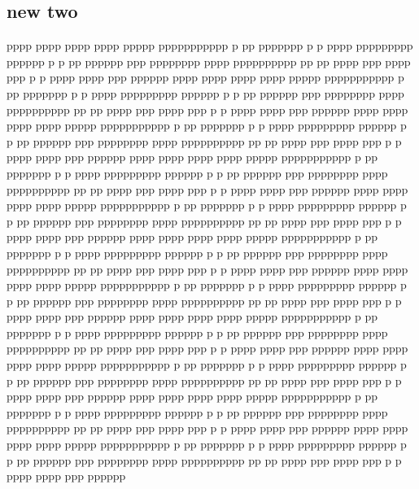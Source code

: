 \documentclass[11pt]{article}
\begin{document}
\subsection{ new two }
pppp pppp pppp pppp ppppp ppppppppppp p pp ppppppp p p pppp ppppppppp pppppp p p pp pppppp ppp pppppppp pppp pppppppppp pp pp pppp ppp pppp ppp p  p pppp pppp ppp pppppp pppp pppp pppp pppp ppppp ppppppppppp p pp ppppppp p p pppp ppppppppp pppppp p p pp pppppp ppp pppppppp pppp pppppppppp pp pp pppp ppp pppp ppp p  p pppp pppp ppp pppppp pppp pppp pppp pppp ppppp ppppppppppp p pp ppppppp p p pppp ppppppppp pppppp p p pp pppppp ppp pppppppp pppp pppppppppp pp pp pppp ppp pppp ppp p  p pppp pppp ppp pppppp pppp pppp pppp pppp ppppp ppppppppppp p pp ppppppp p p pppp ppppppppp pppppp p p pp pppppp ppp pppppppp pppp pppppppppp pp pp pppp ppp pppp ppp p  p pppp pppp ppp pppppp pppp pppp pppp pppp ppppp ppppppppppp p pp ppppppp p p pppp ppppppppp pppppp p p pp pppppp ppp pppppppp pppp pppppppppp pp pp pppp ppp pppp ppp p  p pppp pppp ppp pppppp pppp pppp pppp pppp ppppp ppppppppppp p pp ppppppp p p pppp ppppppppp pppppp p p pp pppppp ppp pppppppp pppp pppppppppp pp pp pppp ppp pppp ppp p  p pppp pppp ppp pppppp pppp pppp pppp pppp ppppp ppppppppppp p pp ppppppp p p pppp ppppppppp pppppp p p pp pppppp ppp pppppppp pppp pppppppppp pp pp pppp ppp pppp ppp p  p pppp pppp ppp pppppp pppp pppp pppp pppp ppppp ppppppppppp p pp ppppppp p p pppp ppppppppp pppppp p p pp pppppp ppp pppppppp pppp pppppppppp pp pp pppp ppp pppp ppp p  p pppp pppp ppp pppppp pppp pppp pppp pppp ppppp ppppppppppp p pp ppppppp p p pppp ppppppppp pppppp p p pp pppppp ppp pppppppp pppp pppppppppp pp pp pppp ppp pppp ppp p  p pppp pppp ppp pppppp pppp pppp pppp pppp ppppp ppppppppppp p pp ppppppp p p pppp ppppppppp pppppp p p pp pppppp ppp pppppppp pppp pppppppppp pp pp pppp ppp pppp ppp p  p pppp pppp ppp pppppp pppp pppp pppp pppp ppppp ppppppppppp p pp ppppppp p p pppp ppppppppp pppppp p p pp pppppp ppp pppppppp pppp pppppppppp pp pp pppp ppp pppp ppp p  p pppp pppp ppp pppppp 
\end{document}
